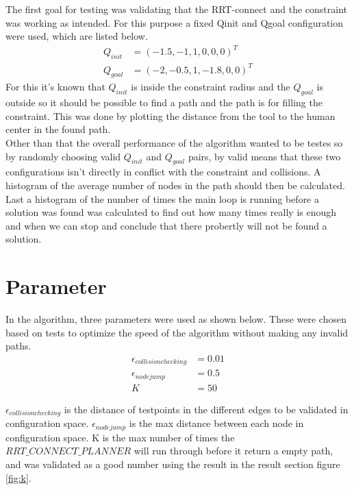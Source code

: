 The first goal for testing was validating that the RRT-connect and the constraint was working as intended. For this purpose a fixed Qinit and Qgoal configuration were used, which are listed below.
\begin{align}
Q_{init} &= (-1.5,-1,1,0,0,0)^{T}  \\
Q_{goal} &=(-2,-0.5,1,-1.8,0,0)^{T}
\end{align}
For this it's known that $Q_{init}$ is inside the constraint radius and the $Q_{goal}$ is outside so it should be possible to find a path and the path is for filling the constraint. This was done by plotting the distance from the tool to the human center in the found path. \\ 
Other than that the overall performance of the algorithm wanted to be testes so by randomly choosing valid $Q_{init}$ and $Q_{goal}$ pairs, by valid means that these two configurations isn't directly in conflict with the constraint and collisions. A histogram of the average number of nodes in the path should then be calculated. \\
Last a histogram of the number of times the main loop is running before a solution was found was calculated to find out how many times really is enough and when we can stop and conclude that there probertly will not be found a solution.

\section{Parameter}
In the algorithm, three parameters were used as shown below. These were chosen based on tests to optimize the speed of the algorithm without making any invalid paths. 
\begin{align}
 \epsilon _{collision checking} &= 0.01  \\
 \epsilon _{node jump} &= 0.5 \\
	K &= 50 
\end{align}

 $\epsilon _{collision checking}$ is the distance of testpoints in the different edges to be validated in configuration space. $\epsilon _{node jump}$ is the max distance between each node in configuration space. K is the max number of times the $RRT\_ CONNECT\_ PLANNER$ will run through before it return a empty path, and was validated as a good number using the result in the result section figure \ref{fig:k}.